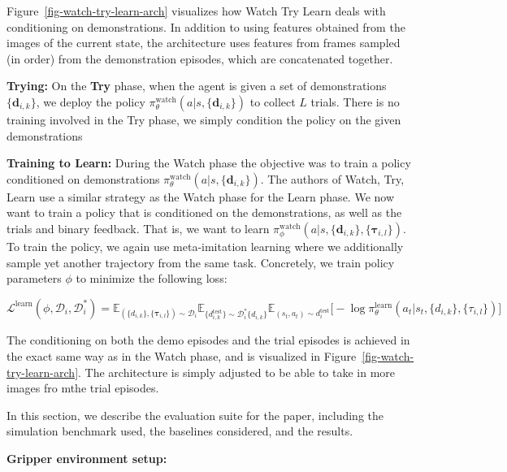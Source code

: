 \documentclass[
  letterpaper,
  numbers=noenddot,
  DIV=11,
  oneside]{scrreprt}
\theoremstyle{remark}
\begin{document}
Figure~\ref{fig-watch-try-learn-arch} visualizes how Watch Try Learn
deals with conditioning on demonstrations. In addition to using features
obtained from the images of the current state, the architecture uses
features from frames sampled (in order) from the demonstration episodes,
which are concatenated together.

\textbf{Trying:} On the \textbf{Try} phase, when the agent is given a
set of demonstrations \(\{\textbf{d}_{i,k}\}\), we deploy the policy
\(\pi_\theta^{\text{watch}}(a | s, \{\textbf{d}_{i,k}\})\) to collect
\(L\) trials. There is no training involved in the Try phase, we simply
condition the policy on the given demonstrations

\textbf{Training to Learn:} During the Watch phase the objective was to
train a policy conditioned on demonstrations
\(\pi_\theta^{\text{watch}}(a | s, \{\textbf{d}_{i,k}\})\). The authors
of Watch, Try, Learn use a similar strategy as the Watch phase for the
Learn phase. We now want to train a policy that is conditioned on the
demonstrations, as well as the trials and binary feedback. That is, we
want to learn
\(\pi_\phi^{\text{watch}}(a | s, \{\textbf{d}_{i,k}\}, \{\mathbf{\tau}_{i, l}\})\).
To train the policy, we again use meta-imitation learning where we
additionally sample yet another trajectory from the same task.
Concretely, we train policy parameters \(\phi\) to minimize the
following loss:

\(\mathcal{L}^{\text{learn}}(\phi, \mathcal{D}_i, \mathcal{D}_i^*) = \mathbb{E}_{(\{d_{i,k}\}, \{\mathbf{\tau}_{i,l}\}) \sim \mathcal{D}_i} \mathbb{E}_{\{d_{i,k}^{\text{test}}\} \sim \mathcal{D}_i^* \{d_{i,k}\}} \mathbb{E}_{(s_t, a_t) \sim d_i^{\text{test}}} \big[
- \log \pi_\theta^{\text{learn}} (a_t | s_t, \{d_{i,k}\}, \{\tau_{i,l}\}) \big]\)

The conditioning on both the demo episodes and the trial episodes is
achieved in the exact same way as in the Watch phase, and is visualized
in Figure~\ref{fig-watch-try-learn-arch}. The architecture is simply
adjusted to be able to take in more images fro mthe trial episodes.

In this section, we describe the evaluation suite for the paper,
including the simulation benchmark used, the baselines considered, and
the results.

\textbf{Gripper environment setup:}
\end{document}
